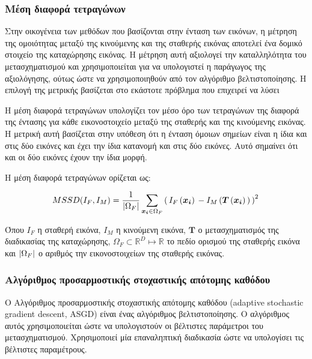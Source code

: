 \documentclass[a4paper,12pt]{article}
\DeclarePairedDelimiter\abs{\lvert}{\rvert}
\newcommand{\R}{\mathbb{R}}
\begin{document}
\subsubsection{Μέση διαφορά τετραγώνων} \label{MSSD}

Στην οικογένεια των μεθόδων που βασίζονται στην ένταση των εικόνων, η μέτρηση
της ομοιότητας μεταξύ της κινούμενης και της σταθερής εικόνας αποτελεί ένα
δομικό στοιχείο της καταχώρησης εικόνας. Η μέτρηση αυτή αξιολογεί την
καταλληλότητα του μετασχηματισμού και χρησιμοποιείται για να υπολογιστεί η
παράγωγος της αξιολόγησης, ούτως ώστε να χρησιμοποιηθούν από τον αλγόριθμο
βελτιστοποίησης. Η επιλογή της μετρικής βασίζεται στο εκάστοτε πρόβλημα που
επιχειρεί να λύσει

Η μέση διαφορά τετραγώνων υπολογίζει τον μέσο όρο των τετραγώνων της διαφορά της
έντασης για κάθε εικονοστοιχείο μεταξύ της σταθερής και της κινούμενης εικόνας.
Η μετρική αυτή βασίζεται στην υπόθεση ότι η ένταση όμοιων σημείων είναι η ίδια
και στις δύο εικόνες και έχει την ίδια κατανομή και στις δύο εικόνες. Αυτό
σημαίνει ότι και οι δύο εικόνες έχουν την ίδια μορφή. 

Η μέση διαφορά τετραγώνων ορίζεται ως:

\begin{equation*}
    MSSD(I_F, I_M) = \frac {1} {\abs{\Omega_F}} \sum_{\bm{x_i} \in \Omega_F} 
        \left(\, {I_F\left(\bm{x_i}\right)\, - 
                  I_M\left(\bm{T}\left(\bm{x_i}\right)\,\right)\,}
        \right)^2\, 
\end{equation*}

Όπου $I_F$ η σταθερή εικόνα, $I_M$ η κινούμενη εικόνα, $\bm{T}$ ο
μετασχηματισμός της διαδικασίας της καταχώρησης, $\Omega_F \subset \R^D \mapsto
\R$ το πεδίο ορισμού της σταθερής εικόνα και $\abs{\Omega_F}$ ο αριθμός την
εικονοστοιχείων της σταθερής εικόνας.


\subsubsection{Αλγόριθμος προσαρμοστικής στοχαστικής απότομης καθόδου}
\label{reg:asgd:1}

Ο Αλγόριθμος προσαρμοστικής στοχαστικής απότομης καθόδου (adaptive stochastic
gradient descent, ASGD) \cite{ASGD:1} είναι ένας αλγόριθμος βελτιστοποίησης. Ο
αλγόριθμος αυτός χρησιμοποιείται ώστε να υπολογιστούν οι βέλτιστες παράμετροι
του μετασχηματισμού. Χρησιμοποιεί μία επαναληπτική διαδικασία ώστε να υπολογίσει
τις βέλτιστες παραμέτρους.
\end{document}
